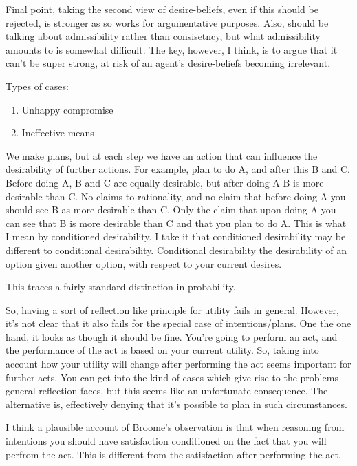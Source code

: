 \documentclass[10pt]{article}
\begin{document}
Final point, taking the second view of desire-beliefs, even if this should be rejected, is stronger as so works for argumentative purposes.
Also, should be talking about admissibility rather than consisetncy, but what admissibility amounts to is somewhat difficult.
The key, however, I think, is to argue that it can't be super strong, at risk of an agent's desire-beliefs becoming irrelevant.

Types of cases:
\begin{enumerate}
\item Unhappy compromise
\item Ineffective means
\end{enumerate}

\noindent\hrulefill

We make plans, but at each step we have an action that can influence the desirability of further actions.
For example, plan to do A, and after this B and C.
Before doing A, B and C are equally desirable, but after doing A B is more desirable than C.
No claims to rationality, and no claim that before doing A you should see B as more desirable than C.
Only the claim that upon doing A you can see that B is more desirable than C and that you plan to do A.
This is what I mean by conditioned desirability.
I take it that conditioned desirability may be different to conditional desirability.
Conditional desirability the desirability of an option given another option, with respect to your current desires.

This traces a fairly standard distinction in probability.

So, having a sort of reflection like principle for utility fails in general.
However, it's not clear that it also fails for the special case of intentions/plans.
One the one hand, it looks as though it should be fine.
You're going to perform an act, and the performance of the act is based on your current utility.
So, taking into account how your utility will change after performing the act seems important for further acts.
You can get into the kind of cases which give rise to the problems general reflection faces, but this seems like an unfortunate consequence.
The alternative is, effectively denying that it's possible to plan in such circumstances.


I think a plausible account of Broome's observation is that when reasoning from intentions you should have satisfaction conditioned on the fact that you will perfrom the act.
This is different from the satisfaction after performing the act.
\end{document}
